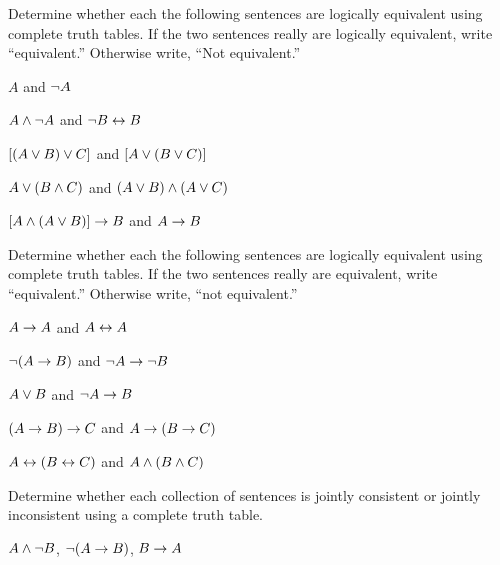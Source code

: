 \begin{practiceproblems}
	\noindent\problempart
	\label{pr.TT.equiv}
	Determine whether each the following sentences are logically equivalent using complete truth tables. If the two sentences really are logically equivalent, write ``equivalent.'' Otherwise write, ``Not equivalent.''
	\begin{earg}
		\item $A$ and $\neg A$
		\item $A \mathbin{\wedge} \neg A$ and $\neg B \leftrightarrow B$
		\item $[(A \vee B) \vee C]$ and $[A \vee (B \vee C)]$
		\item $A \vee (B \mathbin{\wedge} C)$ and $(A \vee B) \mathbin{\wedge} (A \vee C)$
		\item $[A \mathbin{\wedge} (A \vee B)] \rightarrow B$ and $A \rightarrow B$\end{earg}
	
	
	\problempart
	\label{pr.TT.equiv2}
	Determine whether each the following sentences are logically equivalent using complete truth tables. If the two sentences really are equivalent, write ``equivalent.'' Otherwise write, ``not equivalent.''
	\begin{earg}
		\item $A\rightarrow A$ and $A \leftrightarrow A$
		\item $\neg(A \rightarrow B)$ and $\neg A \rightarrow \neg B$
		\item $A \vee B$ and $\neg A \rightarrow B$
		\item$(A \rightarrow B) \rightarrow C$ and $A \rightarrow (B \rightarrow C)$
		\item $A \leftrightarrow (B \leftrightarrow C)$ and $A \mathbin{\wedge} (B \mathbin{\wedge} C)$
	\end{earg}
	
	
	\problempart
	\label{pr.TT.consistent2}
	Determine whether each collection of sentences is jointly consistent or jointly inconsistent using a complete truth table.
	\begin{earg}
		\item $A \mathbin{\wedge} \neg B$, $\neg(A \rightarrow B)$, $B \rightarrow A$\vspace{.5ex} %
		
		

\end{earg}
\end{practiceproblems}
